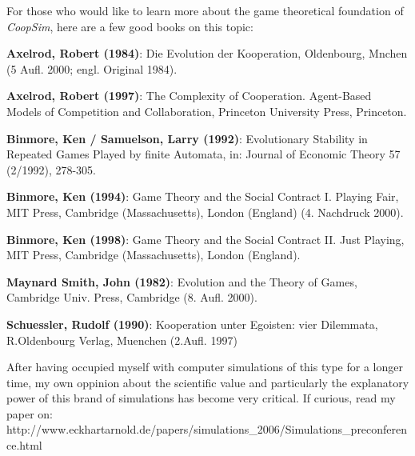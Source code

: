 \documentclass[12pt,a4paper,USenglish]{article}
\begin{document}
For those who would like to learn more about the game theoretical
foundation of {\em CoopSim}, here are a few good books on this
topic:

\setlength{\parindent}{0ex}
\setlength{\parskip}{2ex}

{\bf Axelrod, Robert (1984)}: Die Evolution der Kooperation,
Oldenbourg, Mnchen (5 Aufl. 2000; engl. Original 1984).

{\bf Axelrod, Robert (1997)}: The Complexity of Cooperation. Agent-Based Models of
Competition and Collaboration, Princeton University Press, Princeton.

{\bf Binmore, Ken / Samuelson, Larry (1992)}: Evolutionary Stability in
Repeated Games Played by finite Automata, in: Journal of Economic Theory 57
(2/1992), 278-305.

{\bf Binmore, Ken (1994)}: Game Theory and the Social Contract I. Playing
Fair, MIT Press, Cambridge (Massachusetts), London (England) (4. Nachdruck
2000).

{\bf Binmore, Ken (1998)}: Game Theory and the Social Contract II. Just
Playing, MIT Press, Cambridge (Massachusetts), London (England).

{\bf Maynard Smith, John (1982)}: Evolution and the Theory of Games, Cambridge
Univ. Press, Cambridge (8. Aufl. 2000).

{\bf Schuessler, Rudolf (1990)}: Kooperation unter Egoisten: vier Dilemmata,
R.Oldenbourg Verlag, Muenchen (2.Aufl. 1997)

After having occupied myself with computer simulations of this type for a
longer time, my own oppinion about the scientific value and particularly the
explanatory power of this brand of simulations has become very critical.  If
curious, read my paper on: \\
http://www.eckhartarnold.de/papers/simulations\_2006/Simulations\_preconference.html
\end{document}
